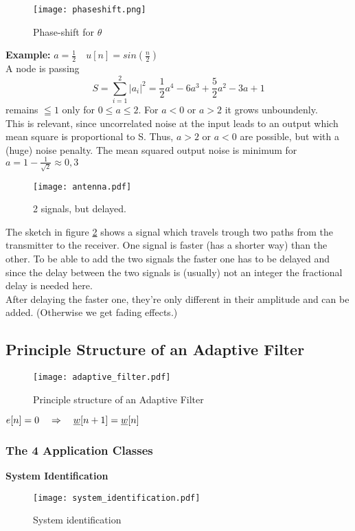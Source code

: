 \begin{figure}[H]
	\centering
	\texttt{[image: phaseshift.png]}
	\caption{Phase-shift for $\theta$}
	\label{phaseshift} 
\end{figure}

\textbf{Example:} $a=\frac{1}{2} \quad u[n]=sin(\frac{n}{2})$\\
A node is passing \[ S= \sum_{i=1}^2 |a_i|^2 = \frac{1}{2}a^4 - 6a^3 +\frac{5}{2} a^2 - 3a+1\] remains $\leqq 1$ only for $0\leq a\leq 2$. For $a < 0  $ or $a > 2$ it grows unboundenly.\\ This is relevant, since uncorrelated noise at the input leads to an output which mean square is proportional to S. Thus, $a > 2$ or $a < 0$ are possible, but with a (huge) noise penalty. The mean squared output noise is minimum for $a = 1-\frac{1}{\sqrt{2}} \approx 0,3$
\begin{figure}[H]
	\centering
	\texttt{[image: antenna.pdf]}
	\caption{2 signals, but delayed.}
	\label{delayedsignal} 
\end{figure}
The sketch in figure \ref{delayedsignal} shows a signal which travels trough two paths from the transmitter to the receiver. One signal is faster (has a shorter way) than the other. To be able to add the two signals the faster one has to be delayed and since the delay between the two signals is (usually) not an integer the fractional delay is needed here.\\
 \pfeil After delaying the faster one, they're only different in their amplitude and can be added. (Otherwise we get fading effects.)

\subsection{Principle Structure of an Adaptive Filter}


\begin{figure}[H]
	\centering
	\texttt{[image: adaptive\_filter.pdf]}
	\caption{Principle structure of an Adaptive Filter}
	\label{adaptive_filter} 
\end{figure}

$e[n] = 0 \quad\Rightarrow\quad \underline{w} [n+1] = \underline{w} [n]$
\subsubsection{The 4 Application Classes}
\textbf{System Identification}
	\begin{figure}[H]
		\centering
		\texttt{[image: system\_identification.pdf]}
		\caption{System identification}
		\label{system_identification} 
	\end{figure}

